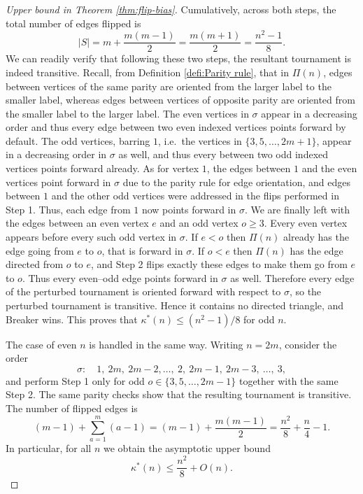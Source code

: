 \documentclass{article}
\theoremstyle{definition}
\theoremstyle{plain}
\theoremstyle{remark}
\theoremstyle{definition}
\begin{document}
\begin{proof}[Upper bound in Theorem \ref{thm:flip-bias}]
Cumulatively, across both steps, the total number of edges flipped is
\[
|S|=m+\frac{m(m-1)}{2}=\frac{m(m+1)}{2}=\frac{n^2-1}{8}.
\]
We can readily verify that following these two steps, the resultant tournament is indeed transitive. Recall, from Definition \ref{defi:Parity rule}, that in $\Pi(n)$, edges between vertices of the same parity are oriented from the larger label to the smaller label, whereas edges between vertices of opposite parity are oriented from the smaller label to the larger label. The even vertices in $\sigma$ appear in a decreasing order and thus every edge between two even indexed vertices points forward by default. The odd vertices, barring $1$, i.e.\ the vertices in $\{3,5,\dots,2m +1\}$, appear in a decreasing order in $\sigma$ as well, and thus every between two odd indexed vertices points forward already. As for vertex $1$, the edges between $1$ and the even vertices point forward in $\sigma$ due to the parity rule for edge orientation, and edges between $1$ and the other odd vertices were addressed in the flips performed in Step 1. Thus, each edge from $1$ now points forward in $\sigma$. We are finally left with the edges between an even vertex $e$ and an odd vertex $o\ge 3$. Every even vertex appears before every such odd vertex in $\sigma$. If $e<o$ then $\Pi(n)$ already has the edge going from $e$ to $o$, that is forward in $\sigma$. If $o<e$ then $\Pi(n)$ has the edge directed from $o$ to $e$, and Step 2 flips exactly these edges to make them go from $e$ to $o$. Thus every even--odd edge points forward in $\sigma$ as well.
Therefore every edge of the perturbed tournament is oriented forward with respect to $\sigma$, so the perturbed tournament is transitive. Hence it contains no directed triangle, and Breaker wins. This proves that $\kappa^*(n)\le (n^2-1)/8$ for odd $n$.

The case of even $n$ is handled in the same way. Writing $n=2m$, consider the order
\[
\sigma:\quad 1,\ 2m,\ 2m-2, \dots,\ 2,\ 2m-1,\ 2m-3,\ \ldots,\ 3,
\]
and perform Step 1 only for odd $o\in\{3,5,\ldots,2m-1\}$ together with the same Step 2. The same parity checks show that the resulting tournament is transitive. The number of flipped edges is
\[
(m-1)+\sum_{a=1}^m (a-1)=(m-1)+\frac{m(m-1)}{2}=\frac{n^2}{8}+\frac{n}{4}-1.
\]
In particular, for all $n$ we obtain the asymptotic upper bound
\begin{equation}\label{eqn:upper}
    \kappa^*(n)\le \frac{n^2}{8}+O(n).
\end{equation}
\end{proof}
\end{document}
